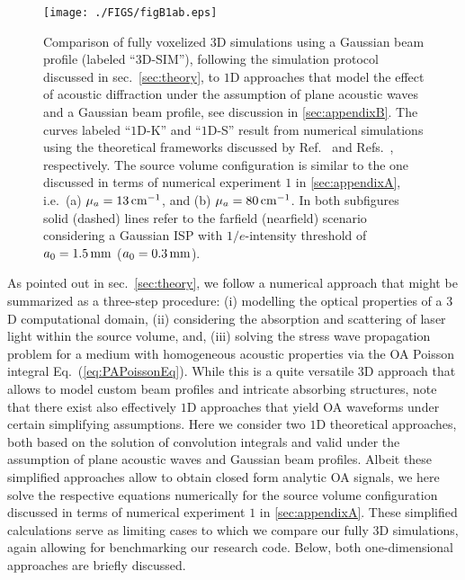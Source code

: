 \documentclass[12pt]{iopart}
\begin{document}
\begin{figure}[t!]
\centerline{\texttt{[image: ./FIGS/figB1ab.eps]}} 
\caption{Comparison of fully voxelized $3$D simulations using a Gaussian beam
profile (labeled ``$3$D-SIM''), following the simulation protocol discussed in sec.\
\ref{sec:theory}, to $1$D approaches that model the effect of 
acoustic diffraction under the assumption of plane acoustic waves and a 
Gaussian beam profile, see discussion in \ref{sec:appendixB}.
The curves labeled ``$1$D-K'' and ``$1$D-S'' result from numerical simulations
using the theoretical frameworks discussed by Ref.\ \cite{Karabutov:1996}
and Refs.\ \cite{Terzic:1984,Sigrist:1986}, respectively.
The source volume configuration is similar to the one discussed in terms of
numerical experiment $1$ in \ref{sec:appendixA}, i.e.\ (a) $\mu_a=13\,{\rm
cm}^{-1}$, and (b) $\mu_a=80\, {\rm cm}^{-1}$. 
In both subfigures solid (dashed) lines 
refer to the farfield (nearfield) scenario considering a Gaussian ISP with 
$1/e$-intensity threshold of $a_0=1.5\,{\rm mm}$ ($a_0=0.3\,{\rm mm}$).}
\label{fig:appendixB}
\end{figure}

As pointed out in sec.\ \ref{sec:theory}, we follow a numerical approach that
might be summarized as a three-step procedure: (i) modelling the optical
properties of a $3$D computational domain, (ii) considering the absorption and
scattering of laser light within the source volume, and, (iii) solving the
stress wave propagation problem for a medium with homogeneous acoustic
properties via the OA Poisson integral Eq.\ (\ref{eq:PAPoissonEq}).  While this
is a quite versatile $3$D approach that allows to model custom beam profiles
and intricate absorbing structures, note that there exist also effectively $1$D
approaches that yield OA waveforms under certain simplifying assumptions.
%
Here we consider two $1$D theoretical approaches, both based on the solution of
convolution integrals and valid under the assumption of plane acoustic
waves and Gaussian beam profiles.  Albeit these simplified approaches allow to
obtain closed form analytic OA signals, we here solve the respective equations
numerically for the source volume configuration discussed in terms of numerical
experiment $1$ in \ref{sec:appendixA}.  These simplified calculations serve as
limiting cases to which we compare our fully $3$D simulations, again allowing
for benchmarking our research code.  Below, both one-dimensional approaches are
briefly discussed. 
\end{document}
